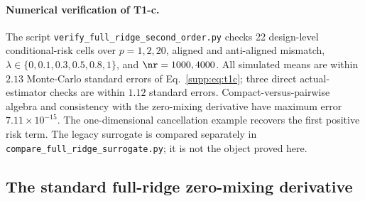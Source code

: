 \paragraph{Numerical verification of T1-c.}
The script \texttt{verify\_full\_ridge\_second\_order.py} checks 22 design-level conditional-risk cells over $p=1,2,20$, aligned and anti-aligned mismatch, $\lambda\in\{0,0.1,0.3,0.5,0.8,1\}$, and $\nr=1000,4000$. All simulated means are within $2.13$ Monte-Carlo standard errors of Eq.~\eqref{supp:eq:t1c}; three direct actual-estimator checks are within $1.12$ standard errors. Compact-versus-pairwise algebra and consistency with the zero-mixing derivative have maximum error $7.11\times10^{-15}$. The one-dimensional cancellation example recovers the first positive risk term. The legacy surrogate is compared separately in \texttt{compare\_full\_ridge\_surrogate.py}; it is not the object proved here.

\subsection{The standard full-ridge zero-mixing derivative}

